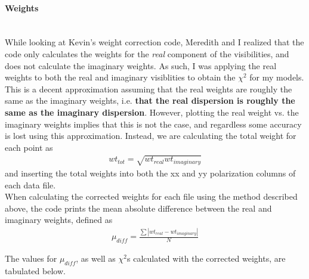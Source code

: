 \documentclass[a4paper]{tufte-handout}
\begin{document}
\paragraph{Weights} \ \\
While looking at Kevin's weight correction code, Meredith and I realized that the code only calculates the weights for the \textit{real} component of the visibilities, and does not calculate the imaginary weights. As such, I was applying the real weights to both the real and imaginary visiblities to obtain the $\chi^2$ for my models. This is a decent approximation assuming that the real weights are roughly the same as the imaginary weights, i.e. \textbf{that the real dispersion is roughly the same as the imaginary dispersion}. However, plotting the real weight vs. the imaginary weights implies that this is not the case, and regardless some accuracy is lost using this approximation. Instead, we are calculating the total weight for each point as
\begin{align}
	\label{weight}
	wt_{tot} = \sqrt{wt_{real}wt_{imaginary}}
\end{align}
and inserting the total weights into both the xx and yy polarization columns of each data file.\\
When calculating the corrected weights for each file using the method described above, the code prints the mean absolute difference between the real and imaginary weights, defined as
\begin{align*}
	\mu_{diff} = \frac{\sum |wt_{real}-wt_{imaginary}|}{N}
\end{align*}

The values for $\mu_{diff}$, as well as $\chi^2$s calculated with the corrected weights, are tabulated below.
\end{document}
